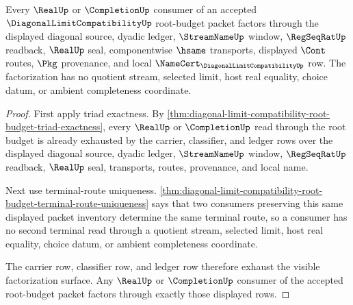 \begin{theorem}
\label{thm:diagonal-limit-compatibility-root-budget-real-completion-factorization}
Every $\RealUp$ or $\CompletionUp$ consumer of an accepted $\DiagonalLimitCompatibilityUp$ root-budget packet factors through the displayed diagonal source, dyadic ledger, $\StreamNameUp$ window, $\RegSeqRatUp$ readback, $\RealUp$ seal, componentwise $\hsame$ transports, displayed $\Cont$ routes, $\Pkg$ provenance, and local $\NameCert_{\DiagonalLimitCompatibilityUp}$ row. The factorization has no quotient stream, selected limit, host real equality, choice datum, or ambient completeness coordinate.
\end{theorem}
\begin{proof}
First apply triad exactness. By \autoref{thm:diagonal-limit-compatibility-root-budget-triad-exactness}, every $\RealUp$ or $\CompletionUp$ read through the root budget is already exhausted by the carrier, classifier, and ledger rows over the displayed diagonal source, dyadic ledger, $\StreamNameUp$ window, $\RegSeqRatUp$ readback, $\RealUp$ seal, transports, routes, provenance, and local name.

Next use terminal-route uniqueness. \autoref{thm:diagonal-limit-compatibility-root-budget-terminal-route-uniqueness} says that two consumers preserving this same displayed packet inventory determine the same terminal route, so a consumer has no second terminal read through a quotient stream, selected limit, host real equality, choice datum, or ambient completeness coordinate.

The carrier row, classifier row, and ledger row therefore exhaust the visible factorization surface. Any $\RealUp$ or $\CompletionUp$ consumer of the accepted root-budget packet factors through exactly those displayed rows.
\end{proof}

